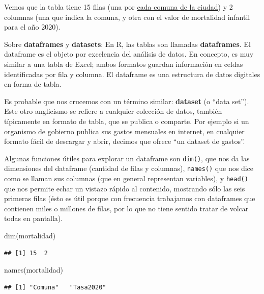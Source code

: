 \documentclass[
]{book}
\newenvironment{Shaded}{\begin{snugshade}}{\end{snugshade}}
\newcommand{\FunctionTok}[1]{\textcolor[rgb]{0.00,0.00,0.00}{#1}}
\newcommand{\NormalTok}[1]{#1}
\begin{document}
Vemos que la tabla tiene 15 filas (una por \href{https://es.wikipedia.org/wiki/Comunas_de_la_ciudad_de_Buenos_Aires}{cada comuna de la ciudad}) y 2 columnas (una que indica la comuna, y otra con el valor de mortalidad infantil para el año 2020).

Sobre \textbf{dataframes} y \textbf{datasets}: En R, las tablas son llamadas \textbf{dataframes}. El dataframe es el objeto por excelencia del análisis de datos. En concepto, es muy similar a una tabla de Excel; ambos formatos guardan información en celdas identificadas por fila y columna. El dataframe es una estructura de datos digitales en forma de tabla.

Es probable que nos crucemos con un término similar: \textbf{dataset} (o ``data set''). Este otro anglicismo se refiere a cualquier colección de datos, también típicamente en formato de tabla, que se publica o comparte. Por ejemplo si un organismo de gobierno publica sus gastos mensuales en internet, en cualquier formato fácil de descargar y abrir, decimos que ofrece ``un dataset de gastos''.

Algunas funciones útiles para explorar un dataframe son \texttt{dim()}, que nos da las dimensiones del dataframe (cantidad de filas y columnas), \texttt{names()} que nos dice como se llaman sus columnas (que en general representan variables), y \texttt{head()} que nos permite echar un vistazo rápido al contenido, mostrando sólo las seis primeras filas (ésto es útil porque con frecuencia trabajamos con dataframes que contienen miles o millones de filas, por lo que no tiene sentido tratar de volcar todas en pantalla).

\begin{Shaded}
\begin{Highlighting}[]
\FunctionTok{dim}\NormalTok{(mortalidad)}
\end{Highlighting}
\end{Shaded}

\begin{verbatim}
## [1] 15  2
\end{verbatim}

\begin{Shaded}
\begin{Highlighting}[]
\FunctionTok{names}\NormalTok{(mortalidad)}
\end{Highlighting}
\end{Shaded}

\begin{verbatim}
## [1] "Comuna"   "Tasa2020"
\end{verbatim}
\end{document}
